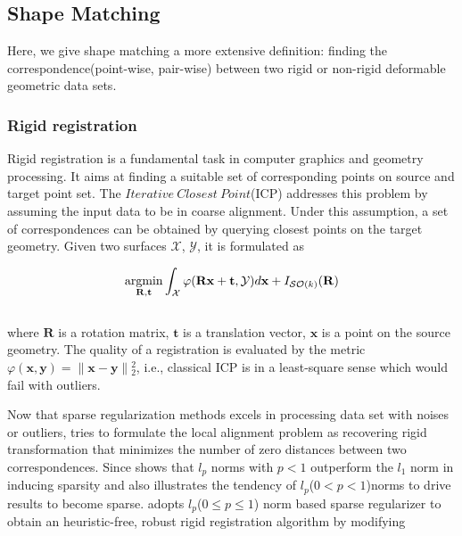 \label{sec:SparseRegularization}


\subsection{Shape Matching}

Here, we give shape matching a more extensive definition: finding the correspondence(point-wise, pair-wise) between two rigid or non-rigid deformable geometric data sets.

\subsubsection{Rigid registration} Rigid registration is a fundamental task in computer graphics and geometry processing. It aims at finding a suitable set of corresponding points on source and target point set. The $Iterative~Closest~Point$(ICP) addresses this problem by assuming the input data to be in coarse alignment. Under this assumption, a set of correspondences can be obtained by querying closest points on the target geometry. Given two surfaces $\mathcal{X}$, $\mathcal{Y}$, it is formulated as

\small{
\begin{equation}
 \label{eq:ICP}
 \mathop{\operatorname*{argmin}}_{\mathbf{R},\mathbf{t}}\int_{\mathcal{X}}^{}\varphi(\mathbf{Rx}+\mathbf{t},\mathcal{Y})d\mathbf{x}+I_{\mathcal{SO}(k)}(\mathbf{R})
\end{equation}
}
\\
where $\mathbf{R}$ is a rotation matrix, $\mathbf{t}$ is a translation vector, $\mathbf{x}$ is a point on the source geometry. The quality of a registration is evaluated by the metric $\varphi(\mathbf{x},\mathbf{y})=\|\mathbf{x}-\mathbf{y}\|{_2^2}$, i.e., classical ICP is in a least-square sense which would fail with outliers.

Now that sparse regularization methods excels in processing data set with noises or outliers, \cite{bouaziz2013sparse} tries to formulate the local alignment problem as recovering rigid transformation that minimizes the number of zero distances between two correspondences. Since \cite{chartrand2007exact} shows that $l_{p}$ norms with $p<1$ outperform the $l_1$ norm in inducing sparsity and \cite{elad2010sparse} also illustrates the tendency of $l_{p}$($0<p<1$)norms to drive results to become sparse. \cite{bouaziz2013sparse} adopts $l_{p}$($0\le p\le1$) norm based sparse regularizer to obtain an heuristic-free, robust rigid registration algorithm by modifying

